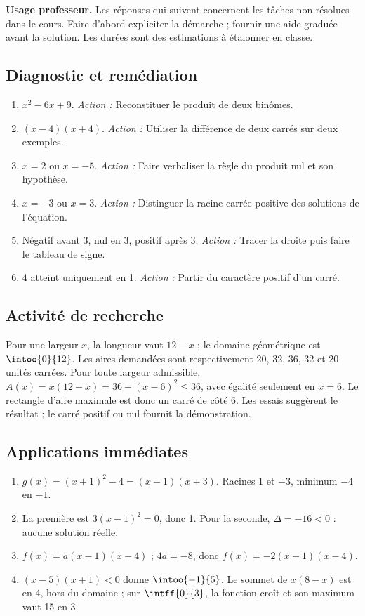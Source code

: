 \label{C02-CORR}
\textbf{Usage professeur.} Les réponses qui suivent concernent les tâches non résolues dans le cours. Faire d’abord expliciter la démarche ; fournir une aide graduée avant la solution. Les durées sont des estimations à étalonner en classe.
\subsection*{Diagnostic et remédiation}
\begin{enumerate}
\item $x^2-6x+9$. \textit{Action :} Reconstituer le produit de deux binômes.
\item $(x-4)(x+4)$. \textit{Action :} Utiliser la différence de deux carrés sur deux exemples.
\item $x=2$ ou $x=-5$. \textit{Action :} Faire verbaliser la règle du produit nul et son hypothèse.
\item $x=-3$ ou $x=3$. \textit{Action :} Distinguer la racine carrée positive des solutions de l’équation.
\item Négatif avant 3, nul en 3, positif après 3. \textit{Action :} Tracer la droite puis faire le tableau de signe.
\item 4 atteint uniquement en 1. \textit{Action :} Partir du caractère positif d’un carré.
\end{enumerate}
\subsection*{Activité de recherche}
Pour une largeur $x$, la longueur vaut $12-x$ ; le domaine géométrique est $\intoo{0}{12}$. Les aires demandées sont respectivement 20, 32, 36, 32 et 20 unités carrées. Pour toute largeur admissible, $A(x)=x(12-x)=36-(x-6)^2\leq36$, avec égalité seulement en $x=6$. Le rectangle d’aire maximale est donc un carré de côté 6. Les essais suggèrent le résultat ; le carré positif ou nul fournit la démonstration.
\subsection*{Applications immédiates}
\begin{enumerate}
\item $g(x)=(x+1)^2-4=(x-1)(x+3)$. Racines 1 et $-3$, minimum $-4$ en $-1$.
\item La première est $3(x-1)^2=0$, donc 1. Pour la seconde, $\Delta=-16<0$ : aucune solution réelle.
\item $f(x)=a(x-1)(x-4)$ ; $4a=-8$, donc $f(x)=-2(x-1)(x-4)$.
\item $(x-5)(x+1)<0$ donne $\intoo{-1}{5}$. Le sommet de $x(8-x)$ est en 4, hors du domaine ; sur $\intff{0}{3}$, la fonction croît et son maximum vaut 15 en 3.
\end{enumerate}
